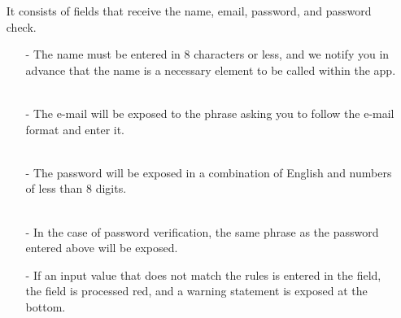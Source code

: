 \documentclass[conference]{IEEEtran}
\begin{document}
\begin{enumerate}
    \item[] It consists of fields that receive the name, email, password, and password check. \\
    \begin{itemize}
    \item[-] The name must be entered in 8 characters or less, and we notify you in advance that the name is a necessary element to be called within the app. \\ \\
    \item[-] The e-mail will be exposed to the phrase asking you to follow the e-mail format and enter it.
    \\ \\
    \item[-] The password will be exposed in a combination of English and numbers of less than 8 digits.
    \\ \\
    \item[-] In the case of password verification, the same phrase as the password entered above will be exposed.
    \\
    \item[-] If an input value that does not match the rules is entered in the field, the field is processed red, and a warning statement is exposed at the bottom.
    

\end{itemize}
\end{enumerate}
\end{document}
